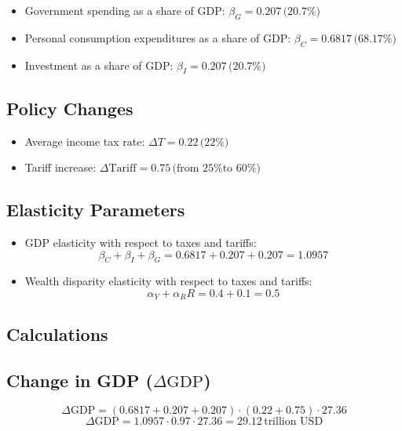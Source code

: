 \documentclass[12pt,letterpaper]{article}
\begin{document}
\begin{itemize}
    \item Government spending as a share of GDP: \( \beta_G = 0.207 \, \text{(20.7\%)} \)
    \item Personal consumption expenditures as a share of GDP: \( \beta_C = 0.6817 \, \text{(68.17\%)} \)
    \item Investment as a share of GDP: \( \beta_I = 0.207 \, \text{(20.7\%)} \)
\end{itemize}

\subsection*{Policy Changes}

\begin{itemize}
    \item Average income tax rate: \( \Delta T = 0.22 \, \text{(22\%)} \)
    \item Tariff increase: \( \Delta \text{Tariff} = 0.75 \, \text{(from 25\% to 60\%)} \)
\end{itemize}

\subsection*{Elasticity Parameters}

\begin{itemize}
    \item GDP elasticity with respect to taxes and tariffs:
    \[
    \beta_C + \beta_I + \beta_G = 0.6817 + 0.207 + 0.207 = 1.0957
    \]
    \item Wealth disparity elasticity with respect to taxes and tariffs:
    \[
    \alpha_Y + \alpha_RR = 0.4 + 0.1 = 0.5
    \]
\end{itemize}

\subsection{Calculations}

\subsection*{Change in GDP (\( \Delta \text{GDP} \))}

\[
\Delta \text{GDP} = (0.6817 + 0.207 + 0.207) \cdot (0.22 + 0.75) \cdot 27.36
\]
\[
\Delta \text{GDP} = 1.0957 \cdot 0.97 \cdot 27.36 = 29.12 \, \text{trillion USD}
\]
\end{document}
